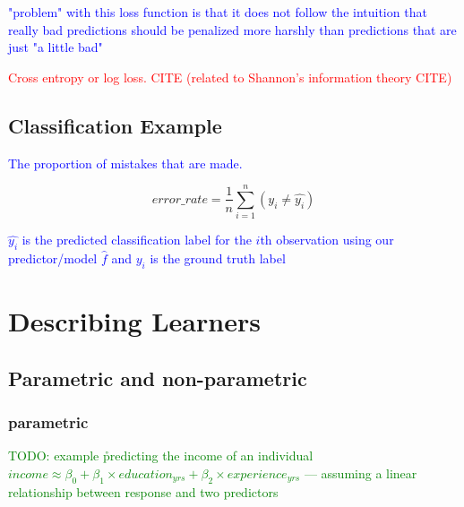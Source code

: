 \textcolor{blue}{"problem" with this loss function is that it does not follow the intuition that really bad predictions should be penalized more harshly than predictions that are just "a little bad"}

\textcolor{red}{Cross entropy or log loss. \textcolor{red}{CITE} (related to Shannon's information theory \textcolor{red}{CITE})}



\subsection{Classification Example}

\textcolor{blue}{The proportion of mistakes that are made.}

\begin{equation}
{error\_rate = \frac{1}{n}\sum_{i=1}^{n}(y_i \ne \hat{y_i})}
\label{eq:class_error_rate_def}
\end{equation}

\textcolor{blue}{$\hat{y_i}$ is the predicted classification label for the $i$th observation using our predictor/model $\hat{f}$ and $y_i$ is the ground truth label}

\section{Describing Learners}

\subsection{Parametric and non-parametric}

\subsubsection{parametric}


\textcolor{green}{TODO: example \r{predicting the income of an individual $income \approx \beta_0 + \beta_1 \times education_{yrs} + \beta_2 \times experience_{yrs}$ --- assuming a linear relationship between response and two predictors}}

